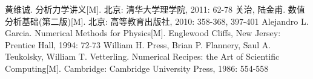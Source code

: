 \documentclass[a4paper,12pt,titlepage]{article}
\begin{document}
\clearpage
{}
\begin{thebibliography}{99}
	 黄维诚. 分析力学讲义[M]. 北京: 清华大学理学院, 2011: 62-78
	 关治, 陆金甫. 数值分析基础(第二版)[M]. 北京: 高等教育出版社, 2010: 358-368, 397-401 
	 Alejandro L. Garcia. Numerical Methods for Physics[M]. Englewood Cliffs, New Jersey: Prentice Hall, 1994: 72-73 
	 William H. Press, Brian P. Flannery, Saul A. Teukolsky, William T. Vetterling. Numerical Recipes: the Art of Scientific Computing[M]. Cambridge: Cambridge University Press, 1986: 554-558 
\end{thebibliography}
\end{document}
